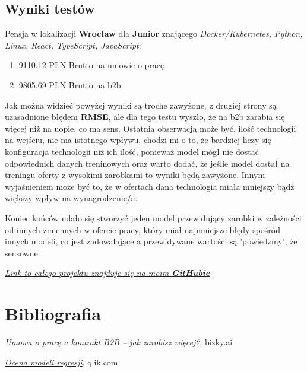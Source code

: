 \documentclass[a4paper]{article}
\begin{document}
\subsection{Wyniki testów}

Pensja w lokalizacji \textbf{Wrocław} dla \textbf{Junior} znającego \textit{Docker/Kubernetes, Python, Linux, React, TypeScript, JavaScript}:

\begin{enumerate}
    \item 9110.12 PLN Brutto na umowie o pracę
    \item 9805.69 PLN Brutto na b2b
\end{enumerate}

\quad Jak można widzieć powyżej wyniki są troche zawyżone, z drugiej strony są uzasadnione błędem \textbf{RMSE}, ale dla tego testu wyszło, że na b2b
zarabia się więcej niż na uopie, co ma sens. Ostatnią obserwacją może być, ilość technologii na wejściu, nie ma istotnego wpływu,
chodzi mi o to, że bardziej liczy się konfiguracja technologii niż ich ilość, ponieważ model mógł nie dostać odpowiednich danych treninowych oraz warto dodać, że jeślie model dostał na treningu oferty
z wysokimi zarobkami to wyniki będą zawyżone. Innym wyjaśnieniem może być to, że w ofertach dana technologia miała mniejszy bądź większy wpływ na wynagrodzenie/a.

\quad Koniec końców udało się stworzyć jeden model przewidujący zarobki w zależności od innych zmiennych w ofercie pracy, który miał najmniejsze błędy spośród innych modeli, co jest zadowalające a
przewidywane wartości są 'powiedzmy', że sensowne.\newline

\begin{center}
    \href{https://github.com/lukaszfabia/RaportIT}{\textit{Link to całego projektu znajduje się na moim \textbf{GitHubie}}}
\end{center}


\section{Bibliografia}

\begin{thebibliography}{9}
    \href{https://bizky.ai/blog/umowa-o-prace-a-kontrakt-b2b-co-sie-bardziej-oplaca/}{\textit{Umowa o pracę a kontrakt B2B – jak zarobisz więcej?}}, bizky.ai

    \href{https://help.qlik.com/pl-PL/cloud-services/Subsystems/Hub/Content/Sense_Hub/AutoML/scoring-regression.htm}{\textit{Ocena modeli regresji}}, qlik.com
\end{thebibliography}
\end{document}
